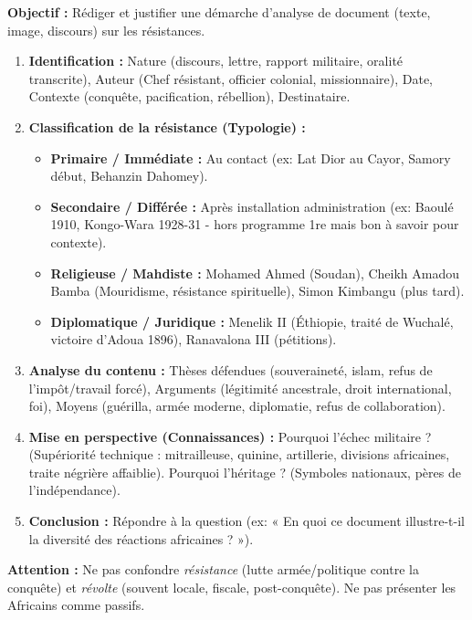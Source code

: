 \documentclass[11pt]{article}
\newcommand{\cle}[1]{{\popxbold\color{popdark}#1}}
\begin{document}
\begin{methode}
\textbf{Objectif :} Rédiger et justifier une démarche d'analyse de document (texte, image, discours) sur les résistances.
\begin{enumerate}
    \item \textbf{Identification :} Nature (discours, lettre, rapport militaire, oralité transcrite), Auteur (Chef résistant, officier colonial, missionnaire), Date, Contexte (conquête, pacification, rébellion), Destinataire.
    \item \textbf{Classification de la résistance (Typologie) :}
        \begin{itemize}
            \item \textbf{Primaire / Immédiate :} Au contact (ex: \cle{Lat Dior} au Cayor, \cle{Samory} début, \cle{Behanzin} Dahomey).
            \item \textbf{Secondaire / Différée :} Après installation administration (ex: \cle{Baoulé} 1910, \cle{Kongo-Wara} 1928-31 - hors programme 1re mais bon à savoir pour contexte).
            \item \textbf{Religieuse / Mahdiste :} \cle{Mohamed Ahmed} (Soudan), \cle{Cheikh Amadou Bamba} (Mouridisme, résistance spirituelle), \cle{Simon Kimbangu} (plus tard).
            \item \textbf{Diplomatique / Juridique :} \cle{Menelik II} (Éthiopie, traité de Wuchalé, victoire d'Adoua 1896), \cle{Ranavalona III} (pétitions).
        \end{itemize}
    \item \textbf{Analyse du contenu :} Thèses défendues (souveraineté, islam, refus de l'impôt/travail forcé), Arguments (légitimité ancestrale, droit international, foi), Moyens (guérilla, armée moderne, diplomatie, refus de collaboration).
    \item \textbf{Mise en perspective (Connaissances) :} Pourquoi l'échec militaire ? (Supériorité technique : \cle{mitrailleuse}, \cle{quinine}, \cle{artillerie}, divisions africaines, traite négrière affaiblie). Pourquoi l'héritage ? (Symboles nationaux, pères de l'indépendance).
    \item \textbf{Conclusion :} Répondre à la question (ex: « En quoi ce document illustre-t-il la diversité des réactions africaines ? »).
\end{enumerate}
\textbf{Attention :} Ne pas confondre \emph{résistance} (lutte armée/politique contre la conquête) et \emph{révolte} (souvent locale, fiscale, post-conquête). Ne pas présenter les Africains comme passifs.
\end{methode}
\end{document}
